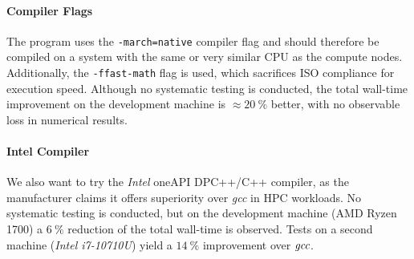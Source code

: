 	\paragraph{Compiler Flags}
		The program uses the \texttt{-march=native} compiler flag and should therefore be compiled on a system with the same or very similar CPU as the compute nodes. Additionally, the \texttt{-ffast-math} flag is used, which sacrifices ISO compliance for execution speed. Although no systematic testing is conducted, the total wall-time improvement on the development machine is $\approx \SI{20}{\percent}$ better, with no observable loss in numerical results. 
	
	\paragraph{Intel Compiler}
		We also want to try the \emph{Intel\textsuperscript{\tiny\textregistered}} oneAPI DPC++/C++ compiler, as the manufacturer claims it offers superiority over \emph{gcc} in HPC workloads. No systematic testing is conducted, but on the development machine (AMD Ryzen 1700) a $\SI{6}{\percent}$ reduction of the total wall-time is observed. Tests on a second machine (\emph{Intel\textsuperscript{\tiny\textregistered} i7-10710U}) yield a $\SI{14}{\percent}$ improvement over $\emph{gcc}$.
			
	


	